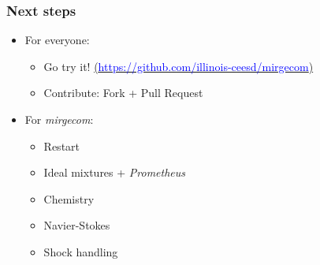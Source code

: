 \begin{frame}\frametitle{Next steps}
\begin{multicols}{2}
\begin{itemize}
\item For everyone:
\begin{itemize}
\item Go try it! \href{https://github.com/illinois-ceesd/mirgecom}{(\textcolor{blue}{https://github.com/illinois-ceesd/mirgecom})}
\item Contribute: Fork + Pull Request 
\end{itemize}
\item For \textit{mirgecom}:
\begin{itemize}
\item Restart
\item Ideal mixtures + \textit{Prometheus}
\item Chemistry
\item Navier-Stokes
\item Shock handling
\end{itemize}
\end{itemize}

\end{multicols}
  \fi
\end{frame}

